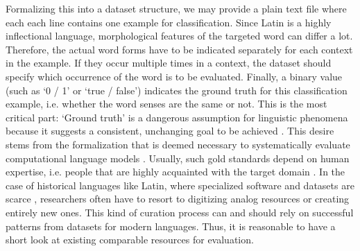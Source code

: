 \documentclass[runningheads]{llncs}
\begin{document}
Formalizing this into a dataset structure, we may provide a plain text file where each each line contains one example for classification. Since Latin is a highly inflectional language, morphological features of the targeted word can differ a lot. Therefore, the actual word forms have to be indicated separately for each context in the example. If they occur multiple times in a context, the dataset should specify which occurrence of the word is to be evaluated. Finally, a binary value (such as `0 / 1' or `true / false') indicates the ground truth for this classification example, i.e. whether the word senses are the same or not. This is the most critical part: `Ground truth' is a dangerous assumption for linguistic phenomena because it suggests a consistent, unchanging goal to be achieved \parencite[129]{leeGeneratingGroundTruth2012}. This desire stems from the formalization that is deemed necessary to systematically evaluate computational language models \parencite[4]{fischerGroundTruthCreation2010}. Usually, such gold standards depend on human expertise, i.e. people that are highly acquainted with the target domain \parencite[519]{uzunerCommunityAnnotationExperiment2010}. In the case of historical languages like Latin, where specialized software and datasets are scarce \parencites[168]{karakantaNeuralMachineTranslation2018}[3]{mcgillivrayMethodsLatinComputational2013}, researchers often have to resort to digitizing analog resources or creating entirely new ones. This kind of curation process can and should rely on successful patterns from datasets for modern languages. Thus, it is reasonable to have a short look at existing comparable resources for evaluation.
\end{document}
